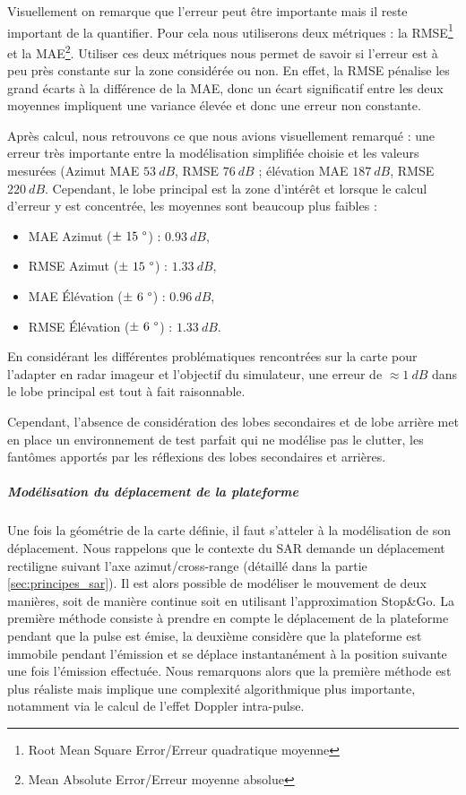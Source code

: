 Visuellement on remarque que l'erreur peut être importante mais il reste important de la quantifier. Pour cela nous utiliserons deux métriques : la RMSE\footnote{Root Mean Square Error/Erreur quadratique moyenne} et la MAE\footnote{Mean Absolute Error/Erreur moyenne absolue}. Utiliser ces deux métriques nous permet de savoir si l'erreur est à peu près constante sur la zone considérée ou non. En effet, la RMSE pénalise les grand écarts à la différence de la MAE, donc un écart significatif entre les deux moyennes impliquent une variance élevée et donc une erreur non constante. 

Après calcul, nous retrouvons ce que nous avions visuellement remarqué : une erreur très importante entre la modélisation simplifiée choisie et les valeurs mesurées (Azimut MAE $53~dB$, RMSE $76~dB$ ; élévation MAE $187~dB$, RMSE $220~dB$. Cependant, le lobe principal est la zone d'intérêt et lorsque le calcul d'erreur y est concentrée, les moyennes sont beaucoup plus faibles :
\begin{itemize}
    \item MAE Azimut ($\pm~15~\degree$) : $0.93~dB$,
    \item RMSE Azimut ($\pm~15~\degree$) : $1.33~dB$,
    \item MAE Élévation ($\pm~6~\degree$) : $0.96~dB$,
    \item RMSE Élévation ($\pm~6~\degree$) : $1.33~dB$.
\end{itemize}
En considérant les différentes problématiques rencontrées sur la carte pour l'adapter en radar imageur et l'objectif du simulateur, une erreur de $\approx1~dB$ dans le lobe principal est tout à fait raisonnable. 

Cependant, l'absence de considération des lobes secondaires et de lobe arrière  met en place un environnement de test parfait qui ne modélise pas le clutter, les fantômes apportés par les réflexions des lobes secondaires et arrières.

\subparagraph{Modélisation du déplacement de la plateforme}
Une fois la géométrie de la carte définie, il faut s'atteler à la modélisation de son déplacement. Nous rappelons que le contexte du SAR demande un déplacement rectiligne suivant l'axe azimut/cross-range (détaillé dans la partie \ref{sec:principes_sar}). Il est alors possible de modéliser le mouvement de deux manières, soit de manière continue soit en utilisant l'approximation Stop\&Go. La première méthode consiste à prendre en compte le déplacement de la plateforme pendant que la pulse est émise, la deuxième considère que la plateforme est immobile pendant l'émission et se déplace instantanément à la position suivante une fois l'émission effectuée. Nous remarquons alors que la première méthode est plus réaliste mais implique une complexité algorithmique plus importante, notamment via le calcul de l'effet Doppler intra-pulse. 

